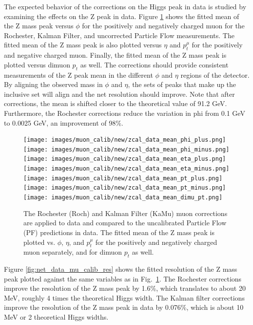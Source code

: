 The expected behavior of the corrections on the Higgs peak in data is studied by examining the effects on the Z peak in data. Figure \ref{fig:net_data_mu_calib_mean} shows the fitted mean of the Z mass peak versus $\phi$ for the positively and negatively charged muon for the Rochester, Kalman Filter, and uncorrected Particle Flow measurements. The fitted mean of the Z mass peak is also plotted versus $\eta$ and $p_{t}^\mu$ for the positively and negative charged muon. Finally, the fitted mean of the Z mass peak is plotted versus dimuon $p_t$ as well. The corrections should provide consistent measurements of the Z peak mean in the different $\phi$ and $\eta$ regions of the detector. By aligning the observed mass in $\phi$ and $\eta$, the sets of peaks that make up the inclusive set will align and the net resolution should improve. Note that after corrections, the mean is shifted closer to the theoretical value of 91.2 GeV. Furthermore, the Rochester corrections reduce the variation in phi from 0.1 GeV to 0.0025 GeV, an improvement of 98\%.
\begin{figure}[!h]
  \centering
  \texttt{[image: images/muon\_calib/new/zcal\_data\_mean\_phi\_plus.png]}
  \texttt{[image: images/muon\_calib/new/zcal\_data\_mean\_phi\_minus.png]}
  \texttt{[image: images/muon\_calib/new/zcal\_data\_mean\_eta\_plus.png]}
  \texttt{[image: images/muon\_calib/new/zcal\_data\_mean\_eta\_minus.png]}
  \texttt{[image: images/muon\_calib/new/zcal\_data\_mean\_pt\_plus.png]}
  \texttt{[image: images/muon\_calib/new/zcal\_data\_mean\_pt\_minus.png]}
  \texttt{[image: images/muon\_calib/new/zcal\_data\_mean\_dimu\_pt.png]}
  \caption[Rochester and Kalman Filter muon corrections on the mean of Z mass peak in data.]
   {The Rochester (Roch) and Kalman Filter (KaMu) muon corrections are applied to data and compared to the uncalibrated Particle Flow (PF) predictions in data. The fitted mean of the Z mass peak is plotted  vs. $\phi$, $\eta$, and $p_{t}^\mu$ for the positively and negatively charged muon separately, and for dimuon $p_t$ as well.}
  \label{fig:net_data_mu_calib_mean}
\end{figure}
Figure \ref{fig:net_data_mu_calib_res} shows the fitted resolution of the Z mass peak plotted against the same variables as in Fig.~\ref{fig:net_data_mu_calib_mean}. The Rochester corrections improve the resolution of the Z mass peak by 1.6\%, which translates to about 20 MeV, roughly 4 times the theoretical Higgs width. The Kalman filter corrections improve the resolution of the Z mass peak in data by 0.076\%, which is about 10 MeV or 2 theoretical Higgs widths.

